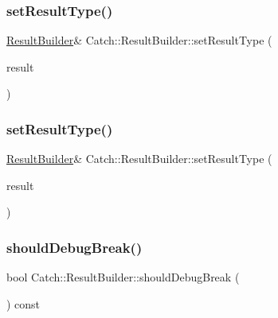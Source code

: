 \subsubsection{\texorpdfstring{set\+Result\+Type()}{setResultType()}\hspace{0.1cm}{\footnotesize\ttfamily [1/2]}}
{\footnotesize\ttfamily \mbox{\hyperlink{class_catch_1_1_result_builder}{Result\+Builder}}\& Catch\+::\+Result\+Builder\+::set\+Result\+Type (\begin{DoxyParamCaption}\item[{\mbox{\hyperlink{struct_catch_1_1_result_was_a624e1ee3661fcf6094ceef1f654601ef}{Result\+Was\+::\+Of\+Type}}}]{result }\end{DoxyParamCaption})}

\mbox{\label{class_catch_1_1_result_builder_ae504348b073d0360bfd5fc33347ec689}} 
\subsubsection{\texorpdfstring{set\+Result\+Type()}{setResultType()}\hspace{0.1cm}{\footnotesize\ttfamily [2/2]}}
{\footnotesize\ttfamily \mbox{\hyperlink{class_catch_1_1_result_builder}{Result\+Builder}}\& Catch\+::\+Result\+Builder\+::set\+Result\+Type (\begin{DoxyParamCaption}\item[{bool}]{result }\end{DoxyParamCaption})}

\mbox{\label{class_catch_1_1_result_builder_a6f2b0dbcc6cc5e0a500ac45f2534e3e7}} 
\subsubsection{\texorpdfstring{should\+Debug\+Break()}{shouldDebugBreak()}}
{\footnotesize\ttfamily bool Catch\+::\+Result\+Builder\+::should\+Debug\+Break (\begin{DoxyParamCaption}{ }\end{DoxyParamCaption}) const}

